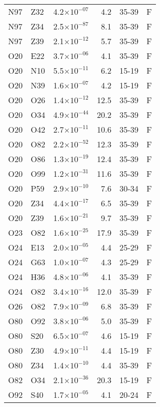 \begin{longtable}{lllrll}
   N97 & Z32 & 4.2$\times10^{-07}$ & 4.2 & 35-39 & F \\ 
   N97 & Z34 & 2.5$\times10^{-87}$ & 8.1 & 35-39 & F \\ 
   N97 & Z39 & 2.1$\times10^{-12}$ & 5.7 & 35-39 & F \\ 
   O20 & E22 & 3.7$\times10^{-06}$ & 4.1 & 35-39 & F \\ 
   O20 & N10 & 5.5$\times10^{-11}$ & 6.2 & 15-19 & F \\ 
   O20 & N39 & 1.6$\times10^{-07}$ & 4.2 & 15-19 & F \\ 
   O20 & O26 & 1.4$\times10^{-12}$ & 12.5 & 35-39 & F \\ 
   O20 & O34 & 4.9$\times10^{-44}$ & 20.2 & 35-39 & F \\ 
   O20 & O42 & 2.7$\times10^{-11}$ & 10.6 & 35-39 & F \\ 
   O20 & O82 & 2.2$\times10^{-52}$ & 12.3 & 35-39 & F \\ 
   O20 & O86 & 1.3$\times10^{-19}$ & 12.4 & 35-39 & F \\ 
   O20 & O99 & 1.2$\times10^{-31}$ & 11.6 & 35-39 & F \\ 
   O20 & P59 & 2.9$\times10^{-10}$ & 7.6 & 30-34 & F \\ 
   O20 & Z34 & 4.4$\times10^{-17}$ & 6.5 & 35-39 & F \\ 
   O20 & Z39 & 1.6$\times10^{-21}$ & 9.7 & 35-39 & F \\ 
   O23 & O82 & 1.6$\times10^{-25}$ & 17.9 & 35-39 & F \\ 
   O24 & E13 & 2.0$\times10^{-05}$ & 4.4 & 25-29 & F \\ 
   O24 & G63 & 1.0$\times10^{-07}$ & 4.3 & 25-29 & F \\ 
   O24 & H36 & 4.8$\times10^{-06}$ & 4.1 & 35-39 & F \\ 
   O24 & O82 & 3.4$\times10^{-16}$ & 12.0 & 35-39 & F \\ 
   O26 & O82 & 7.9$\times10^{-09}$ & 6.8 & 35-39 & F \\ 
   O80 & O92 & 3.8$\times10^{-06}$ & 5.0 & 35-39 & F \\ 
   O80 & S20 & 6.5$\times10^{-07}$ & 4.6 & 15-19 & F \\ 
   O80 & Z30 & 4.9$\times10^{-11}$ & 4.4 & 15-19 & F \\ 
   O80 & Z34 & 1.4$\times10^{-10}$ & 4.4 & 35-39 & F \\ 
   O82 & O34 & 2.1$\times10^{-36}$ & 20.3 & 15-19 & F \\ 
   O92 & S40 & 1.7$\times10^{-05}$ & 4.1 & 20-24 & F \\ 

\end{longtable}
